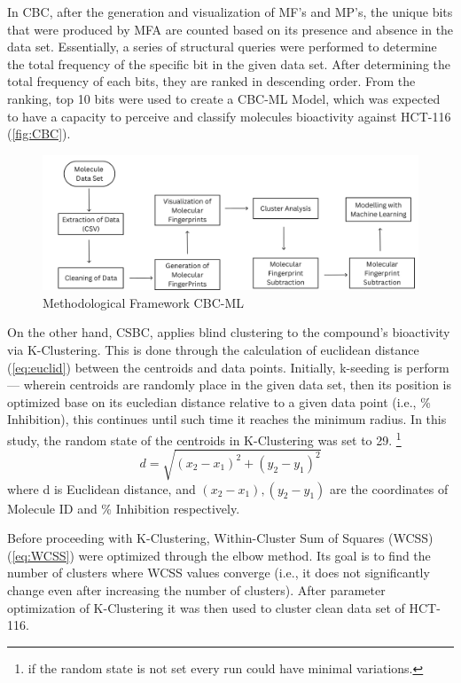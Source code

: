 In CBC, after the generation and visualization of MF's and MP's, the unique bits that were produced by MFA are counted based on its presence and absence in the data set. Essentially, a series of structural queries were performed to determine the total frequency of the specific bit in the given data set. After determining the total frequency of each bits, they are ranked in descending order. From the ranking, top 10 bits were used to create a CBC-ML Model, which was expected to have a capacity to perceive and classify molecules bioactivity against HCT-116 (\autoref{fig:CBC}). 

\begin{figure}[h] %
    \centering
    \hspace{-1.05cm}
    \includegraphics[scale=0.22]{csbcv2.png} %
    \caption{Methodological Framework CBC-ML}
    \label{fig:CSBC} %
\end{figure}

On the other hand, CSBC, applies blind clustering to the compound's bioactivity via K-Clustering. This is done through the calculation of euclidean distance (\ref{eq:euclid}) between the centroids and data points. Initially, k-seeding is perform --- wherein centroids are randomly place in the given data set, then its position is optimized base on its eucledian distance relative to a given data point (i.e., \% Inhibition), this continues until such time it reaches the minimum radius. In this study, the random state of the centroids in K-Clustering was set to 29. \footnote{if the random state is not set every run could have minimal variations.}    
 \begin{equation}
    d =\sqrt{(x_{2}-x_{1})^2 +(y_{2}-y_{1})^2}
\label{eq:euclid}
\end{equation}
where d is Euclidean distance, and $(x_{2}-x_{1}),(y_{2}-y_{1})$ are the coordinates of Molecule ID and \% Inhibition respectively. 

Before proceeding with K-Clustering, Within-Cluster Sum of Squares (WCSS) (\ref{eq:WCSS}) were optimized through the elbow method. Its goal is to find the number of clusters where WCSS values converge (i.e., it does not significantly change even after increasing the number of clusters). After parameter optimization of K-Clustering it was then used to cluster clean data set of HCT-116. 

